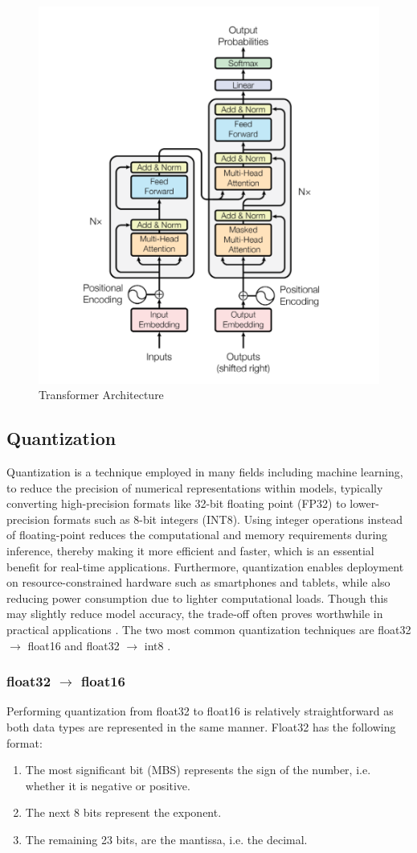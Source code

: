\documentclass[licencjacka,en]{pracamgr}
\begin{document}
\begin{figure}
    \centering
    \includegraphics[width=0.5\linewidth]{bachelor_images/transformer_arch.png}
    \caption{Transformer Architecture \cite{attention}}
    \label{fig:transformers_fig}
\end{figure}

\subsection{Quantization}
Quantization is a technique employed in many fields including machine learning, to reduce the precision of numerical representations within models, typically converting high-precision formats like 32-bit floating point (FP32) to lower-precision formats such as 8-bit integers (INT8). Using integer operations instead of floating-point reduces the computational and memory requirements during inference, thereby making it more efficient and faster, which is an essential benefit for real-time applications. Furthermore, quantization enables deployment on resource-constrained hardware such as smartphones and tablets, while also reducing power consumption due to lighter computational loads. Though this may slightly reduce model accuracy, the trade-off often proves worthwhile in practical applications \cite{ibm_quantization}.
The two most common quantization techniques are float32 $\rightarrow$ float16 and float32 $\rightarrow$ int8 \cite{quant_hf}.
\subsubsection{float32 $\rightarrow$ float16}
Performing quantization from float32 to float16 is relatively straightforward as both data types are represented in the same manner. Float32 has the following format:
\begin{enumerate}
	\item The most significant bit (MBS) represents the sign of the number, i.e. whether it is negative or positive.
	\item The next 8 bits represent the exponent.
	\item The remaining 23 bits, are the mantissa, i.e. the decimal.
\end{enumerate}
\end{document}

